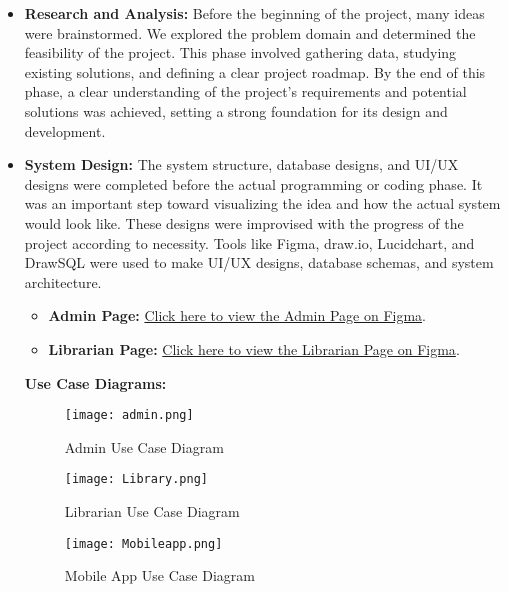 \documentclass[a4paper,14pt]{article}
\begin{document}
{{{{{{{{{		
		{
			\noindent \normalsize
			\justifying \begin{itemize}
				\item \textbf{Research and Analysis:} Before the beginning of the project, many ideas were brainstormed. We explored the problem domain and determined the feasibility of the project. This phase involved gathering data, studying existing solutions, and defining a clear project roadmap. By the end of this phase, a clear understanding of the project’s requirements and potential solutions was achieved, setting a strong foundation for its design and development.
				
				\item \textbf{System Design:} The system structure, database designs, and UI/UX designs were completed before the actual programming or coding phase. It was an important step toward visualizing the idea and how the actual system would look like. These designs were improvised with the progress of the project according to necessity. Tools like Figma, draw.io, Lucidchart, and DrawSQL were used to make UI/UX designs, database schemas, and system architecture.
				
				\begin{itemize}
					\item \textbf{Admin Page:} 
					\href{https://www.figma.com/design/xpEOuhvu0LM2jiCI0Tz14c/Untitled?node-id=0-1&p=f&t=lDXXVtaxPlAWCjQE-0}{Click here to view the Admin Page on Figma}.
					
					\item \textbf{Librarian Page:} 
					\href{https://www.figma.com/design/xpEOuhvu0LM2jiCI0Tz14c/Untitled?node-id=230-89&p=f&t=3ufbitsFo2T2aDHW-0}{Click here to view the Librarian Page on Figma}.
				\end{itemize}
				
				\vspace{0.5cm}
				\newpage 
				\noindent \textbf{Use Case Diagrams:}
				
				\begin{figure}[h!]
					\centering
					\texttt{[image: admin.png]}
					\caption{Admin Use Case Diagram}
					\label{fig:admin-use-case}
				\end{figure}
				\newpage
				\begin{figure}[h!]
					\centering
					\texttt{[image: Library.png]}
					\caption{Librarian Use Case Diagram}
					\label{fig:librarian-use-case}
				\end{figure}
				\newpage
				\begin{figure}[h!]
					\centering
					\texttt{[image: Mobileapp.png]}
					\caption{Mobile App Use Case Diagram}
					\label{fig:mobileapp-use-case}
				\end{figure}
				

\end{itemize}}}}}}}}}}}
\end{document}
